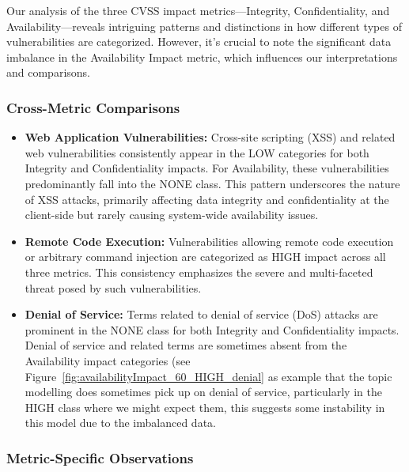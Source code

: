 Our analysis of the three CVSS impact metrics---Integrity, Confidentiality, and Availability---reveals intriguing patterns and distinctions in how different types of vulnerabilities are categorized. However, it's crucial to note the significant data imbalance in the Availability Impact metric, which influences our interpretations and comparisons.

\subsubsection{Cross-Metric Comparisons}

\begin{itemize}
	\item \textbf{Web Application Vulnerabilities:} Cross-site scripting (XSS) and related web vulnerabilities consistently appear in the LOW categories for both Integrity and Confidentiality impacts. For Availability, these vulnerabilities predominantly fall into the NONE class. This pattern underscores the nature of XSS attacks, primarily affecting data integrity and confidentiality at the client-side but rarely causing system-wide availability issues.
	\item \textbf{Remote Code Execution:} Vulnerabilities allowing remote code execution or arbitrary command injection are categorized as HIGH impact across all three metrics. This consistency emphasizes the severe and multi-faceted threat posed by such vulnerabilities.
	\item \textbf{Denial of Service:} Terms related to denial of service (DoS) attacks are prominent in the NONE class for both Integrity and Confidentiality impacts. Denial of service and related terms are sometimes absent from the Availability impact categories (see Figure~\ref{fig:availabilityImpact_60_HIGH_denial} as example that the topic modelling does sometimes pick up on denial of service, particularly in the HIGH class where we might expect them, this suggests some instability in this model due to the imbalanced data.
\end{itemize}

\subsubsection{Metric-Specific Observations}

